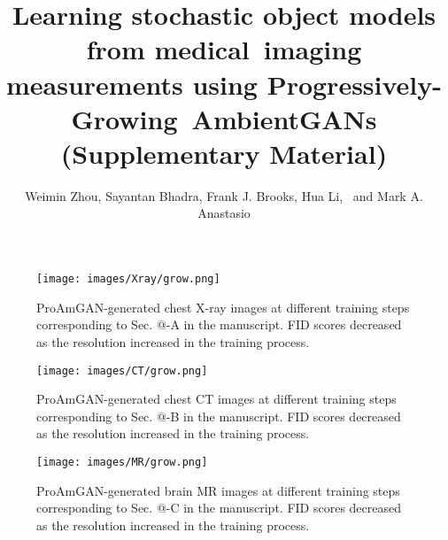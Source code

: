 \documentclass[journal, onecolumn]{IEEEtran}
\makeatletter
\newcommand*{\rom}[1]{\expandafter\@slowromancap\romannumeral #1@}
\makeatother
\begin{document}
\title{Learning stochastic object models from medical~imaging measurements using Progressively-Growing~AmbientGANs \\
 (Supplementary Material)}
\author{Weimin Zhou,
        Sayantan Bhadra,
        Frank J. Brooks, %
        Hua Li,~%
        and Mark A. Anastasio
}
\maketitle




  \vspace{-0.5cm}
  \begin{figure}[H]
	\centering
	\texttt{[image: images/Xray/grow.png]}
	\caption{ProAmGAN-generated chest X-ray images at different training steps corresponding to Sec. \rom{4}-A in the manuscript. FID scores decreased as the resolution increased in the training process.}
	\label{fig:g_mri}
\end{figure}
  \vspace{-0.8cm}
  \begin{figure}[H]
	\centering
	\texttt{[image: images/CT/grow.png]}
	\caption{ProAmGAN-generated chest CT images at different training steps corresponding to Sec. \rom{4}-B in the manuscript. FID scores decreased as the resolution increased in the training process.}
	\label{fig:g_mri}
\end{figure}
  \vspace{-0.8cm}
  \begin{figure}[H]
	\centering
	\texttt{[image: images/MR/grow.png]}
	\caption{ProAmGAN-generated brain MR images at different training steps corresponding to Sec. \rom{4}-C in the manuscript. FID scores decreased as the resolution increased in the training process.}
	\label{fig:g_mri}
\end{figure}
\end{document}
